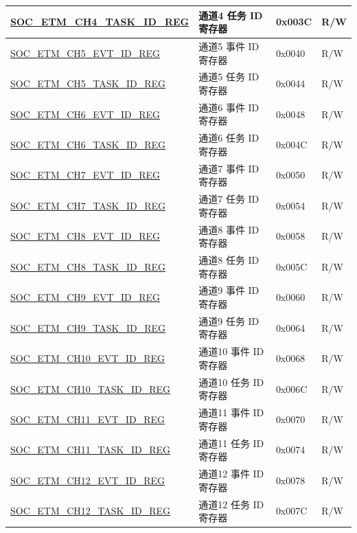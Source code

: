 \begin{longtable}{ | p{6cm} | p{6.2cm} | p{1.3cm} | p{2cm} | }
\hyperref[regdesc:SOCETMCH0TASKIDREG]{SOC\_ETM\_CH4\_TASK\_ID\_REG} & 通道4 任务 ID 寄存器 & 0x003C & R/W \\ \hline
\hyperref[regdesc:SOCETMCH0EVTIDREG]{SOC\_ETM\_CH5\_EVT\_ID\_REG} & 通道5 事件 ID 寄存器 & 0x0040 & R/W \\ \hline
\hyperref[regdesc:SOCETMCH0TASKIDREG]{SOC\_ETM\_CH5\_TASK\_ID\_REG} & 通道5 任务 ID 寄存器 & 0x0044 & R/W \\ \hline
\hyperref[regdesc:SOCETMCH0EVTIDREG]{SOC\_ETM\_CH6\_EVT\_ID\_REG} & 通道6 事件 ID 寄存器 & 0x0048 & R/W \\ \hline
\hyperref[regdesc:SOCETMCH0TASKIDREG]{SOC\_ETM\_CH6\_TASK\_ID\_REG} & 通道6 任务 ID 寄存器 & 0x004C & R/W \\ \hline
\hyperref[regdesc:SOCETMCH0EVTIDREG]{SOC\_ETM\_CH7\_EVT\_ID\_REG} & 通道7 事件 ID 寄存器 & 0x0050 & R/W \\ \hline
\hyperref[regdesc:SOCETMCH0TASKIDREG]{SOC\_ETM\_CH7\_TASK\_ID\_REG} & 通道7 任务 ID 寄存器 & 0x0054 & R/W \\ \hline
\hyperref[regdesc:SOCETMCH0EVTIDREG]{SOC\_ETM\_CH8\_EVT\_ID\_REG} & 通道8 事件 ID 寄存器 & 0x0058 & R/W \\ \hline
\hyperref[regdesc:SOCETMCH0TASKIDREG]{SOC\_ETM\_CH8\_TASK\_ID\_REG} & 通道8 任务 ID 寄存器 & 0x005C & R/W \\ \hline
\hyperref[regdesc:SOCETMCH0EVTIDREG]{SOC\_ETM\_CH9\_EVT\_ID\_REG} & 通道9 事件 ID 寄存器 & 0x0060 & R/W \\ \hline
\hyperref[regdesc:SOCETMCH0TASKIDREG]{SOC\_ETM\_CH9\_TASK\_ID\_REG} & 通道9 任务 ID 寄存器 & 0x0064 & R/W \\ \hline
\hyperref[regdesc:SOCETMCH0EVTIDREG]{SOC\_ETM\_CH10\_EVT\_ID\_REG} & 通道10 事件 ID 寄存器 & 0x0068 & R/W \\ \hline
\hyperref[regdesc:SOCETMCH0TASKIDREG]{SOC\_ETM\_CH10\_TASK\_ID\_REG} & 通道10 任务 ID 寄存器 & 0x006C & R/W \\ \hline
\hyperref[regdesc:SOCETMCH0EVTIDREG]{SOC\_ETM\_CH11\_EVT\_ID\_REG} & 通道11 事件 ID 寄存器 & 0x0070 & R/W \\ \hline
\hyperref[regdesc:SOCETMCH0TASKIDREG]{SOC\_ETM\_CH11\_TASK\_ID\_REG} & 通道11 任务 ID 寄存器 & 0x0074 & R/W \\ \hline
\hyperref[regdesc:SOCETMCH0EVTIDREG]{SOC\_ETM\_CH12\_EVT\_ID\_REG} & 通道12 事件 ID 寄存器 & 0x0078 & R/W \\ \hline
\hyperref[regdesc:SOCETMCH0TASKIDREG]{SOC\_ETM\_CH12\_TASK\_ID\_REG} & 通道12 任务 ID 寄存器 & 0x007C & R/W \\ \hline

\end{longtable}
